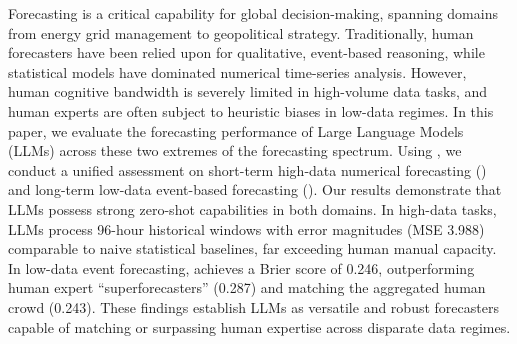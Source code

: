 Forecasting is a critical capability for global decision-making, spanning domains from energy grid management to geopolitical strategy. Traditionally, human forecasters have been relied upon for qualitative, event-based reasoning, while statistical models have dominated numerical time-series analysis. However, human cognitive bandwidth is severely limited in high-volume data tasks, and human experts are often subject to heuristic biases in low-data regimes. In this paper, we evaluate the forecasting performance of Large Language Models (LLMs) across these two extremes of the forecasting spectrum. Using \methodname, we conduct a unified assessment on short-term high-data numerical forecasting (\ettm) and long-term low-data event-based forecasting (\forecastbench). Our results demonstrate that LLMs possess strong zero-shot capabilities in both domains. In high-data tasks, LLMs process 96-hour historical windows with error magnitudes (MSE 3.988) comparable to naive statistical baselines, far exceeding human manual capacity. In low-data event forecasting, \methodname achieves a Brier score of 0.246, outperforming human expert ``superforecasters'' (0.287) and matching the aggregated human crowd (0.243). These findings establish LLMs as versatile and robust forecasters capable of matching or surpassing human expertise across disparate data regimes.
